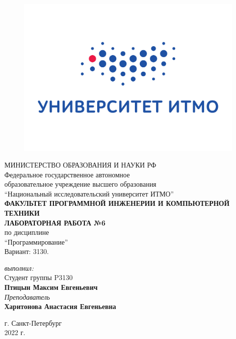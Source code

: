 \begin{center}

	\begin{figure}[H]
	\centering
	\includegraphics[scale=0.3]{img/logo}
	\end{figure}
	\hfill \break
	МИНИСТЕРСТВО ОБРАЗОВАНИЯ И НАУКИ РФ\\
	\hfill \break
	Федеральное государственное автономное\\
	образовательное учреждение высшего образования\\
	``Национальный исследовательский университет ИТМО''\\
	\hfill \break
	\textbf{ФАКУЛЬТЕТ ПРОГРАММНОЙ ИНЖЕНЕРИИ И КОМПЬЮТЕРНОЙ ТЕХНИКИ}\\
	\vspace{3cm}
	\large{\textbf{ЛАБОРАТОРНАЯ РАБОТА №6}}\\
	\hfill \break
	по дисциплине\\
	\large{``Программирование''}\\
	\hfill \break
	Вариант: 3130.
	\vspace{5cm}
	\begin{flushright}
	\textit{выполнил:}\\
	Студент группы P3130\\
	\textbf{Птицын Максим Евгеньевич}\\
	\textit{Преподаватель}\\
	\textbf{Харитонова Анастасия Евгеньевна}
	\end{flushright}
\end{center}

\vfill


\begin{center} г. Санкт-Петербург\\2022 г.
\end{center}

\thispagestyle{empty}
\newpage